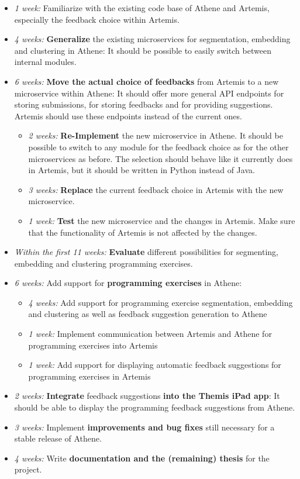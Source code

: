 \begin{itemize}
    \item \textit{1 week:} Familiarize with the existing code base of Athene and Artemis, especially the feedback choice within Artemis.
    \item \textit{4 weeks:} \textbf{Generalize} the existing microservices for segmentation, embedding and clustering in Athene: It should be possible to easily switch between internal modules.
    \item \textit{6 weeks:} \textbf{Move the actual choice of feedbacks} from Artemis to a new microservice within Athene: It should offer more general API endpoints for storing submissions, for storing feedbacks and for providing suggestions. Artemis should use these endpoints instead of the current ones.
    \begin{itemize}
        \item \textit{2 weeks:} \textbf{Re-Implement} the new microservice in Athene. It should be possible to switch to any module for the feedback choice as for the other microservices as before. The selection should behave like it currently does in Artemis, but it should be written in Python instead of Java.
        \item \textit{3 weeks:} \textbf{Replace} the current feedback choice in Artemis with the new microservice.
        \item \textit{1 week:} \textbf{Test} the new microservice and the changes in Artemis. Make sure that the functionality of Artemis is not affected by the changes.
    \end{itemize}
    \item \textit{Within the first 11 weeks:} \textbf{Evaluate} different possibilities for segmenting, embedding and clustering programming exercises. %
    \item \textit{6 weeks:} Add support for \textbf{programming exercises} in Athene:
    \begin{itemize}
        \item \textit{4 weeks:} Add support for programming exercise segmentation, embedding and clustering as well as feedback suggestion generation to Athene
        \item \textit{1 week:} Implement communication between Artemis and Athene for programming exercises into Artemis
        \item \textit{1 week:} Add support for displaying automatic feedback suggestions for programming exercises in Artemis
    \end{itemize}
    \item \textit{2 weeks:} \textbf{Integrate} feedback suggestions \textbf{into the Themis iPad app}: It should be able to display the programming feedback suggestions from Athene.
    \item \textit{3 weeks:} Implement \textbf{improvements and bug fixes} still necessary for a stable release of Athene.
    \item \textit{4 weeks:} Write \textbf{documentation and the (remaining) thesis} for the project.
\end{itemize}


\clearpage

\clearpage




